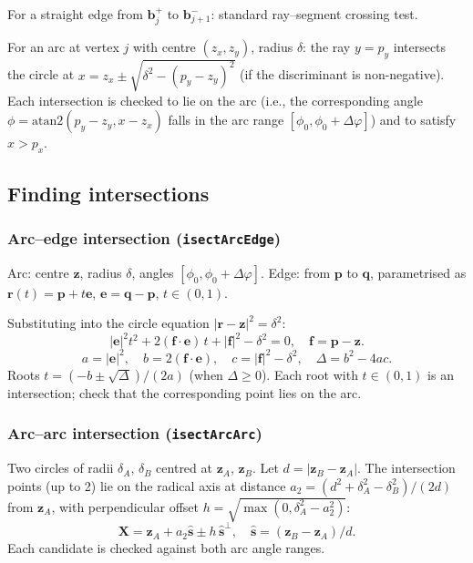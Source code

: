 \documentclass[12pt]{article}
\begin{document}
For a straight edge from $\mathbf{b}^+_j$ to $\mathbf{b}^-_{j+1}$: standard
ray–segment crossing test.

For an arc at vertex $j$ with centre $(z_x, z_y)$, radius $\delta$: the ray
$y = p_y$ intersects the circle at $x = z_x \pm \sqrt{\delta^2 - (p_y - z_y)^2}$
(if the discriminant is non-negative).  Each intersection is checked to lie on the
arc (i.e., the corresponding angle $\phi = \mathrm{atan2}(p_y - z_y, x - z_x)$ falls
in the arc range $[\phi_0, \phi_0 + \Delta\varphi]$) and to satisfy $x > p_x$.

\subsection{Finding intersections}

\subsubsection{Arc–edge intersection (\texttt{isectArcEdge})}

Arc: centre $\mathbf{z}$, radius $\delta$, angles $[\phi_0, \phi_0 + \Delta\varphi]$.
Edge: from $\mathbf{p}$ to $\mathbf{q}$, parametrised as $\mathbf{r}(t) = \mathbf{p} + t\mathbf{e}$,
$\mathbf{e} = \mathbf{q} - \mathbf{p}$, $t \in (0,1)$.

Substituting into the circle equation $|\mathbf{r} - \mathbf{z}|^2 = \delta^2$:
\[
  |\mathbf{e}|^2 t^2 + 2(\mathbf{f}\cdot\mathbf{e})\,t + |\mathbf{f}|^2 - \delta^2 = 0,
  \quad \mathbf{f} = \mathbf{p} - \mathbf{z}.
\]
\[
  a = |\mathbf{e}|^2, \quad b = 2(\mathbf{f}\cdot\mathbf{e}), \quad
  c = |\mathbf{f}|^2 - \delta^2, \quad \Delta = b^2 - 4ac.
\]
Roots $t = (-b \pm \sqrt{\Delta})/(2a)$ (when $\Delta \geq 0$).  Each root with
$t \in (0,1)$ is an intersection; check that the corresponding point lies on the arc.

\subsubsection{Arc–arc intersection (\texttt{isectArcArc})}

Two circles of radii $\delta_A$, $\delta_B$ centred at $\mathbf{z}_A$, $\mathbf{z}_B$.
Let $d = |\mathbf{z}_B - \mathbf{z}_A|$.  The intersection points (up to 2) lie on the
radical axis at distance $a_2 = (d^2 + \delta_A^2 - \delta_B^2)/(2d)$ from $\mathbf{z}_A$,
with perpendicular offset $h = \sqrt{\max(0, \delta_A^2 - a_2^2)}$:
\[
  \mathbf{X} = \mathbf{z}_A + a_2 \hat{\mathbf{s}} \pm h\,\hat{\mathbf{s}}^\perp,
  \quad \hat{\mathbf{s}} = (\mathbf{z}_B - \mathbf{z}_A)/d.
\]
Each candidate is checked against both arc angle ranges.
\end{document}

